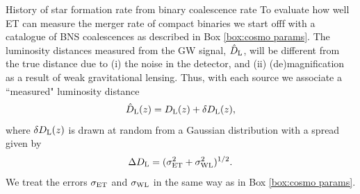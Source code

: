{History of star formation rate from binary coalescence rate}
{
To evaluate how well ET can measure the merger rate of compact
binaries we start offf with a catalogue of BNS coalescences as
described in Box \ref{box:cosmo params}.
The luminosity distances measured from the GW signal, $\hat{D}_{\rm L}$, will be 
different from the true distance due to (i) the noise in the detector, and 
(ii) (de)magnification as a result of weak gravitational lensing. 
Thus, with each source we associate a ``measured" luminosity distance
\begin{equation}
\hat{D}_{\rm L}(z) = D_{\rm L}(z) + \delta D_{\rm L}(z),
\label{DLmeasured}
\end{equation}
where $\delta D_{\rm L}(z)$ is drawn at random from a Gaussian distribution 
with a spread given by
\begin{equation}
\Delta D_{\rm L} = (\sigma_{\rm ET}^2 + \sigma_{\rm WL}^2)^{1/2}.
\label{disterr}
\end{equation}
We treat the errors $\sigma_{\rm ET}$ and $\sigma_{\rm WL}$ 
in the same way as in Box \ref{box:cosmo params}.
}
